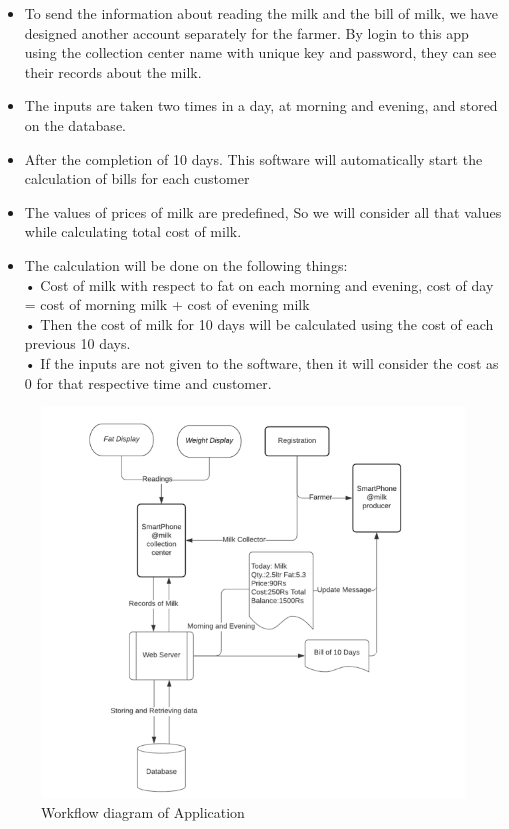 \documentclass[english]{article}
\begin{document}
\begin{itemize}
\item To send the information about reading the milk and the bill of milk, we have designed another account separately for the farmer. By login to this app using the collection center name with unique key and password, they can see their records about the milk.
\item The inputs are taken two times in a day, at morning and evening, and stored on the database.
\item After the completion of 10 days. This software will automatically start the calculation of bills for each customer
\item	The values of prices of milk are predefined, So we will consider all that values while calculating total cost of milk.
\item The calculation will be done on the following things:\\
•	Cost of milk with respect to fat on each morning and evening,
cost of day = cost of morning milk + cost of evening milk\\
•	Then the cost of milk for 10 days will be calculated using the cost of each previous 10 days.\\
•	If the inputs are not given to the software, then it will consider the cost as 0 for that respective time and customer.\\
\end{itemize}
\begin{figure}[H]
\centering
\includegraphics[scale=0.5]{databse 1.png}
\caption{Workflow diagram of Application }
\end{figure}
\end{document}
